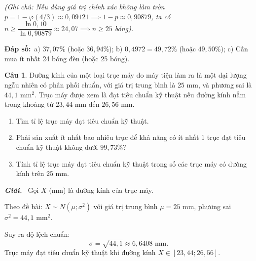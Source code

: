 \documentclass[12pt,a4paper]{article}
\theoremstyle{definition}
\newtheorem{cau}{Câu}
\newcommand{\giai}{\noindent\textbf{\textit{Giải.}}\ }
\newcommand{\dapso}[1]{\noindent\textbf{Đáp số:}\ #1}
\begin{document}
\begin{enumerate}[label=\alph*.]
    \textit{(Ghi chú: Nếu dùng giá trị chính xác không làm tròn $p = 1 - \varphi(4/3) \approx 0{,}09121 \implies 1 - p \approx 0{,}90879$, ta có $n \ge \dfrac{\ln 0{,}10}{\ln 0{,}90879} \approx 24{,}07 \implies n \ge 25$ bóng).}
\end{enumerate}

\dapso{a) $37{,}07\%$ (hoặc $36{,}94\%$); \quad b) $0{,}4972 = 49{,}72\%$ (hoặc $49{,}50\%$); \quad c) Cần mua ít nhất 24 bóng đèn (hoặc 25 bóng).}

\vspace{1.5em}
\begin{cau}
Đường kính của một loại trục máy do máy tiện làm ra là một đại lượng ngẫu nhiên có phân phối chuẩn, với giá trị trung bình là $25\text{ mm}$, và phương sai là $44{,}1\text{ mm}^2$. Trục máy được xem là đạt tiêu chuẩn kỹ thuật nếu đường kính nằm trong khoảng từ $23{,}44\text{ mm}$ đến $26{,}56\text{ mm}$.
\begin{enumerate}[label=\arabic*)]
    \item Tìm tỉ lệ trục máy đạt tiêu chuẩn kỹ thuật.
    \item Phải sản xuất ít nhất bao nhiêu trục để khả năng có ít nhất 1 trục đạt tiêu chuẩn kỹ thuật không dưới $99{,}73\%$?
    \item Tính tỉ lệ trục máy đạt tiêu chuẩn kỹ thuật trong số các trục máy có đường kính trên $25\text{ mm}$.
\end{enumerate}
\end{cau}

\giai
Gọi $X$ (mm) là đường kính của trục máy.

Theo đề bài: $X \sim N(\mu; \sigma^2)$ với giá trị trung bình $\mu = 25\text{ mm}$, phương sai $\sigma^2 = 44{,}1\text{ mm}^2$.

Suy ra độ lệch chuẩn:
\[
\sigma = \sqrt{44{,}1} \approx 6{,}6408\text{ mm}.
\]
Trục máy đạt tiêu chuẩn kỹ thuật khi đường kính $X \in [23{,}44; 26{,}56]$.
\end{document}
